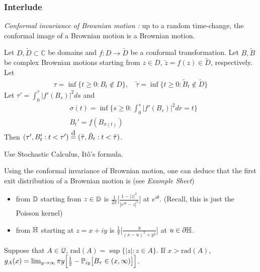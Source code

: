 \documentclass[12pt,a4paper]{article}
\newcommand\xeq{\stackrel{\mathclap{\normalfont\mbox{d}}}{=}}
\newenvironment{proof}
{\begin{changemargin}{0.5cm}{0.5cm} 
	}%
	{\end{changemargin}
}
\newenvironment{p}
{\begin{proof} 
	}%
	{\end{proof}
}
\begin{document}
\subsubsection*{Interlude}

\emph{Conformal invariance of Brownian motion :} up to a random time-change, the conformal image of a Brownian motion is a Brownian motion.
\s

\thm Let $D, \tilde{D} \subset \mathbb{C}$ be domains and $f: D\rightarrow \tilde{D}$ be a conformal transformation. Let $B, \tilde{B}$ be complex Brownian motions starting from $z\in D$, $\tilde{z} =f(z) \in \tilde{D}$, respectively. Let
\begin{align*}
\tau = \inf \{t\geq 0 : B_t \not\in D\}, \quad \tilde{\tau} = \inf \{t\geq 0: \tilde{B}_t\not\in \tilde{D} \}
\end{align*}
Let $\tau' = \int_0^{\tau} |f'(B_s)|^2 ds$ and 
\begin{align*}
& \sigma(t) = \inf\{ s\geq 0 : \int_0^s |f'(B_r)|^2 dr =t \} \\
& B_t' = f(B_{\sigma(t)})
\end{align*}
Then $(\tau', B_t' : t<\tau' ) \xeq (\tilde{\tau}, \tilde{B}_t : t< \tilde{\tau})$.
\begin{p}
\pf Use Stochastic Calculus, It\^{o}'s formula.

\eop
\end{p}

\s

Using the conformal invariance of Brownian motion, one can deduce that the first exit distribution of a Brownian motion is (see \emph{Example Sheet})


\begin{itemize}
\item from $\mathbb{D}$ starting from $z\in \mathbb{D}$ is $\frac{1}{2\pi} \Big[\frac{ 1-|z|^2 }{ |e^{i\theta} -z|^2 }\Big]$ at $e^{i\theta}$. (Recall, this is just the Poisson kernel)
\item from $\mathbb{H}$ starting at $z= x+ iy$ is $\frac{1}{\pi} \Big[ \frac{y}{(x-u)^2 + y^2} \Big]$ at $u\in \partial \mathbb{H}$.
\end{itemize}
\s

\prop Suppose that $A\in \mathscr{Q}$, $\text{rad}(A) = \sup \{ |z| : z\in A \}$. If $x> \text{rad}(A)$, $g_A(x) = \lim_{y\rightarrow \infty} \pi y \Big[ \frac{1}{2} - \mathbb{P}_{iy} \big[ B_{\tau} \in (x, \infty) \big] \Big]$.
\end{document}

